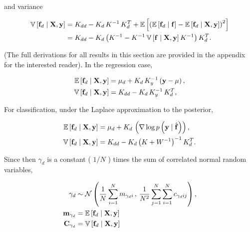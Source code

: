 \documentclass{draft}
\newcommand{\pd}{\ensuremath{\partial \,}}     %
\newcommand{\gradient}{\ensuremath{\mathbf{f}_d}} %
\begin{document}
and variance %

\vspace*{-\baselineskip}
\begin{align}
    \V \left[ \gradient \mid \mathbf{X}, \mathbf{y} \right]
    & =
    K_{dd} - K_d \, K^{-1} \, K_d^T
    + \E \left[ \left( \E \left[ \gradient \mid \mathbf{f} \right] - \E \left[ \gradient \mid \mathbf{X}, \mathbf{y} \right] \right)^2 \right] \nonumber \\
    & = 
    K_{dd} - K_d \left( K^{-1} - K^{-1} \V \left[ \mathbf{f} \mid \mathbf{X}, \mathbf{y} \right] K^{-1} \right) K_d^T.
\end{align}

\noindent
(The full derivations for all results in this section are provided in the appendix for the interested reader).
In the regression case,

\vspace*{-\baselineskip}
\begin{align}
    \E \left[ \gradient \mid \mbf{X}, \mbf{y} \right]
    & = \mu_d + K_d \, K_y^{-1} \left( \mbf{y} - \mu \right), \\
    \V \left[ \gradient \mid \mbf{X}, \mbf{y} \right]
    & = 
    K_{dd} - K_d \, K_y^{-1} \, K_d^T,
\end{align}

\noindent
For classification, under the Laplace approximation to the posterior,

\vspace*{-\baselineskip}
\begin{align}
    \E \left[ \gradient \mid \mbf{X}, \mbf{y} \right]
    & = \mu_d + K_d \, \left( \nabla \log p \left( \mbf{y} \mid \hat{\mbf{f}} \right) \right), \\
    \V \left[ \gradient \mid \mbf{X}, \mbf{y} \right]
    & = 
    K_{dd} - K_d \left( K + W^{-1} \right)^{-1} K_d^T.
\end{align}

Since then \( \gamma_d \) is a constant ( \( 1/N \) ) times the sum of correlated normal random variables,

\vspace*{-\baselineskip}
\begin{align}
    \gamma_d
    & \sim
    \N \left(
        \dfrac{1}{N} \sum_{i=1}^N m_{\gamma_d i} \, , \,
        \dfrac{1}{N^2} \sum_{j=1}^N \sum_{i=1}^N c_{\gamma_d ij}
    \right), \label{eq:avg-partial-distribution} \\
    \mbf{m}_{\gamma_d} & = \E \left[ \gradient \mid \mbf{X}, \mbf{y} \right] \\
    \mbf{C}_{\gamma_d} & = \V \left[ \gradient \mid \mbf{X}, \mbf{y} \right]
\end{align}
\end{document}
